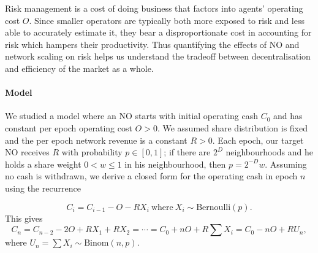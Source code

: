 Risk management is a cost of doing business that factors into agents' operating cost $O$.
%
Since smaller operators are typically both more exposed to risk and less able to accurately estimate it, they bear a disproportionate cost in accounting for risk which hampers their productivity.
%
Thus quantifying the effects of NO and network scaling on risk helps us understand the tradeoff between decentralisation and efficiency of the market as a whole.

\begin{comment}
\subsubsection*{Redistribution lottery structure}
 
A risk factor that is straightforwardly under the direct control of the system is the structure of the redistribution lottery.
%
Currently, in each epoch the full redistribution payout is awarded to a single NO with probability weighted by the number of bins and the NO share within the target bin.
%
Clearly, such an approach has higher variance than the expectation-equivalent deterministic system, which doles out a share of the payout weighted by the number of bins and bin share with probability $1$.

The random approach saves on computational costs by reducing the number of transfers that must be made in each epoch.
%
On the other hand, it introduces a risk of drawdowns and bankruptcy that especially affects smaller scale NOs, who may experience long strings of epochs without receiving any payout.
\end{comment}

\paragraph{Model}

We studied a model where an NO starts with initial operating cash $C_0$ and has constant per epoch operating cost $O>0$.
%
We assumed share distribution is fixed and the per epoch network revenue is a constant $R>0$.
%
Each epoch, our target NO receives $R$ with probability $p\in[0,1]$; if there are $2^D$ neighbourhoods and he holds a share weight $0<w\leq 1$ in his neighbourhood, then $p=2^{-D}w$.
%
Assuming no cash is withdrawn, we derive a closed form for the operating cash in epoch $n$ using the recurrence

\[
  C_i = C_{i-1} - O - RX_i~ \text{where}~ X_i \sim \mathrm{Bernoulli}(p).
\]
This gives 
\[
  C_n = C_{n-2} - 2O + RX_1 + RX_2 = \cdots = C_0 + nO + R\sum X_i = C_0 - nO + RU_n,
\]
where $U_n = \sum X_i \sim \mathrm{Binom}(n,p)$.

